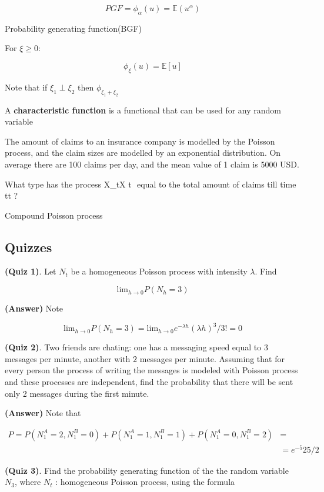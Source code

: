 \documentclass[12pt]{article}
\theoremstyle{nonumberbreak}
\begin{document}
  
$$
PGF = \phi_\alpha (u) = \mathbb{E}(u^\alpha)
$$




Probability generating function(BGF)


For $\xi \ge 0$:

$$
\phi_\xi (u) = \mathbb{E}[u]
$$ 


Note that if $\xi_1 \perp \xi_2$ then  $\phi_{\xi_1+\xi_2}$




A \textbf{characteristic function} is a functional that can be used for any random variable

The amount of claims to an insurance company is modelled by the Poisson process, and the claim sizes are modelled by an exponential distribution. On average there are 100 claims per day, and the mean value of 1 claim is 5000 USD.

What type has the process X_tX 
t
​	  equal to the total amount of claims till time tt ?

Compound Poisson process


\subsection{Quizzes}

\textbf{(Quiz 1)}. Let $N_t$ be a homogeneous Poisson process with intensity $\lambda$. Find

$$
\mathrm{lim}_{h\to0} P(N_h = 3)
$$

\textbf{(Answer)} Note

$$
\mathrm{lim}_{h\to0} P(N_h = 3) = \mathrm{lim}_{h\to0} e^{-\lambda h} (\lambda h)^3/3! = 0
$$


\textbf{(Quiz 2)}. Two friends are chating: one has a messaging speed equal to $3$ messages per minute, another with $2$ messages per minute. Assuming that for every person the process of writing the messages is modeled with Poisson process and these processes are independent, find the probability that there will be sent only 2 messages during the first minute.

\textbf{(Answer)} Note that

$$
\begin{aligned}
P = P(N_1^A = 2, N_1^B = 0) + P(N_1^A = 1, N_1^B = 1) + P(N_1^A = 0, N_1^B = 2) &= \\[8pt]
&= e^{-5} 25/2
\end{aligned}
$$



\textbf{(Quiz 3)}. Find the probability generating function of the the random variable $N_3$, where $N_t$ : homogeneous Poisson process, using the formula 
\end{document}
